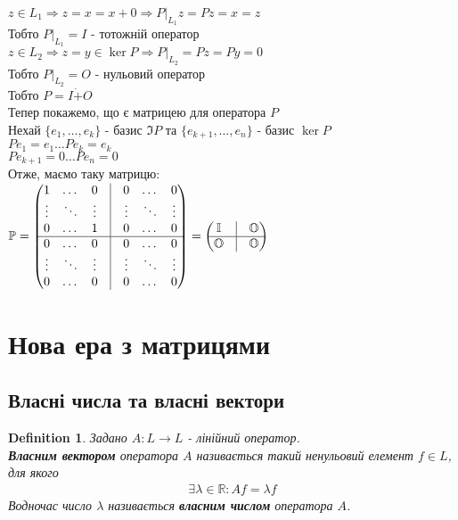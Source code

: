\documentclass[a4paper, 10pt]{article}
\theoremstyle{theoremdd}
\newtheorem{definition}[theorem]{Definition}
\begin{document}
$z \in L_1 \Rightarrow z = x = x+0 \Rightarrow P|_{L_1}z = Pz = x = z$\\
Тобто $P|_{L_1} = I$ - тотожній оператор\\
$z \in L_2 \Rightarrow z = y \in \ker P \Rightarrow P|_{L_2} = Pz = Py = 0$\\
Тобто $P|_{L_2} = O$ - нульовий оператор\\
Тобто $P = I \dot{+} O$
\bigskip \\
Тепер покажемо, що є матрицею для оператора $P$\\
Нехай $\{e_1,\dots,e_k\}$ - базис $\Im P$ та $\{e_{k+1},\dots,e_n\}$ - базис $\ker P$\\
$Pe_1 = e_1 \dots Pe_k = e_k$\\
$Pe_{k+1} = 0 \dots Pe_n = 0$\\
Отже, маємо таку матрицю:\\
$\mathbb{P} = \begin{pmatrix}
1 & \dots & 0 & \vline & 0 & \dots & 0 \\
\vdots & \ddots & \vdots & \vline & \vdots & \ddots & \vdots \\
0 & \dots & 1 & \vline & 0 & \dots & 0 \\
\hline
0 & \dots & 0 & \vline & 0 & \dots & 0 \\
\vdots & \ddots & \vdots & \vline & \vdots & \ddots & \vdots \\
0 & \dots & 0 & \vline & 0 & \dots & 0 \\
\end{pmatrix} = \begin{pmatrix}
\mathbb{I}  & \vline & \mathbb{O} \\
 \hline
\mathbb{O} & \vline & \mathbb{O}
\end{pmatrix}$
\fi

\newpage
\setcounter{section}{3}
\setcounter{subsection}{0}
\section{Нова ера з матрицями}
\subsection{Власні числа та власні вектори}
\begin{definition}
Задано $A: L \to L$ - лінійний оператор.\\
\textbf{Власним вектором} оператора $A$ називається такий ненульовий елемент $f \in L$, для якого
\begin{align*}
\exists \lambda \in \mathbb{R}: Af = \lambda f
\end{align*}
Водночас число $\lambda$ називається \textbf{власним числом} оператора $A$.
\end{definition}
\end{document}
